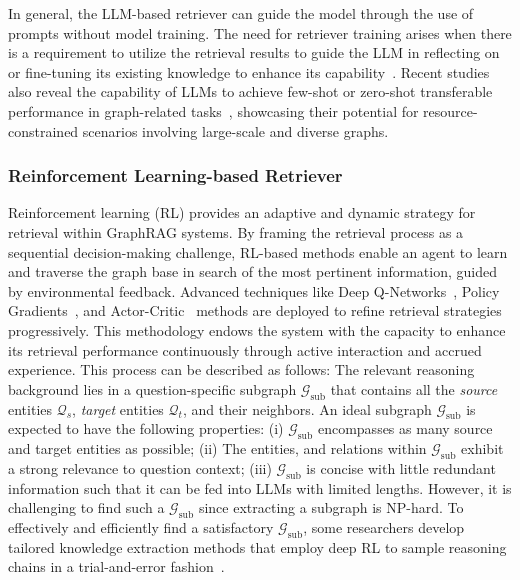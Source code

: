 \documentclass[lettersize,journal]{IEEEtran}
\begin{document}
In general, the LLM-based retriever can guide the model through the use of prompts without model training. The need for retriever training arises when there is a requirement to utilize the retrieval results to guide the LLM in reflecting on or fine-tuning its existing knowledge to enhance its capability~\cite{luo2024reasoning}. Recent studies also reveal the capability of LLMs to achieve few-shot or zero-shot transferable performance in graph-related tasks~\cite{li2023survey-graphmeetllms,li2024zerog,li2024graphintelligence}, showcasing their potential for resource-constrained scenarios involving large-scale and diverse graphs.


\subsubsection{Reinforcement Learning-based Retriever}
Reinforcement learning (RL) provides an adaptive and dynamic strategy for retrieval within GraphRAG systems. By framing the retrieval process as a sequential decision-making challenge, RL-based methods enable an agent to learn and traverse the graph base in search of the most pertinent information, guided by environmental feedback. Advanced techniques like Deep Q-Networks~\cite{wang2024m}, Policy Gradients~\cite{kulkarni2024reinforcement}, and Actor-Critic~\cite{gupta2024stackfeed} methods are deployed to refine retrieval strategies progressively. This methodology endows the system with the capacity to enhance its retrieval performance continuously through active interaction and accrued experience. This process can be described as follows:
The relevant reasoning background lies in a question-specific subgraph $\mathcal{G}_{\text{sub}}$ that contains all the \textit{source} entities $\mathcal{Q}_s$, \textit{target} entities $\mathcal{Q}_t$, and their neighbors. An ideal subgraph $\mathcal{G}_{\text{sub}}$ is expected to have the following properties: 
(i) $\mathcal{G}_{\text{sub}}$ encompasses as many source and target entities as possible;
(ii) The entities, and relations within $\mathcal{G}_{\text{sub}}$ exhibit a strong relevance to question context;
(iii) $\mathcal{G}_{\text{sub}}$ is concise with little redundant information such that it can be fed into LLMs with limited lengths.
However, it is challenging to find such a $\mathcal{G}_{\text{sub}}$ since extracting a subgraph is NP-hard. To effectively and efficiently find a satisfactory $\mathcal{G}_{\text{sub}}$, some researchers develop tailored knowledge extraction methods that employ deep RL to sample reasoning chains in a trial-and-error fashion~\cite{Zhang-etal24KnowGPT,shen2025insight}.
\end{document}
